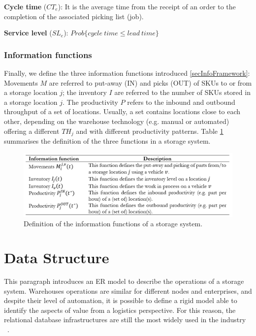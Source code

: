 \textbf{Cycle time} ($CT_e$): It is the average time from the receipt of an order to the completion of the associated picking list (job). \par

\textbf{Service level} ($SL_e$): $Prob\{cycle\ time\le lead\ time\}$

\subsubsection{Information functions}

Finally, we define the three information functions introduced \ref{secInfoFramework}: Movements $M$ are referred to put-away (IN) and picks (OUT) of SKUs to or from a storage location $j$; the inventory $I$ are referred to the number of SKUs stored in a storage location $j$. The productivity $P$ refers to the inbound and outbound throughput of a set of locations. Usually, a set contains locations close to each other, depending on the warehouse technology (e.g. manual or automated) offering a different $TH_j$ and with different productivity patterns. Table \ref{tab_information_function_wh} summarises the definition of the three functions in a storage system.

\begin{figure}[hbt!]
\centering
\includegraphics[width=1\textwidth]{SectionWarehouses/diagnsticModels_figures/tab_information_function_wh.png}
\captionsetup{type=table}
\caption{Definition of the information functions of a storage system.}
\label{tab_information_function_wh}
\end{figure}


\section{Data Structure}
This paragraph introduces an ER model to describe the operations of a storage system. Warehouses operations are similar for different nodes and enterprises, and despite their level of automation, it is possible to define a rigid model able to identify the aspects of value from a logistics perspective. For this reason, the relational database infrastructures are still the most widely used in the industry ~\cite{Accorsi2014}. 

